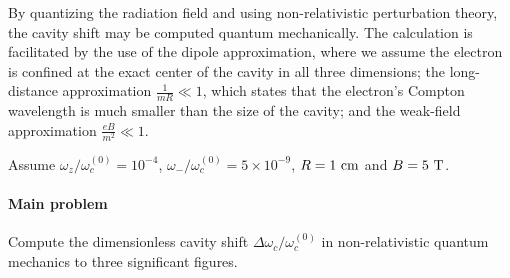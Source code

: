 By quantizing the radiation field and using non-relativistic perturbation theory, the cavity shift may be computed quantum mechanically. The calculation is facilitated by the use of the dipole approximation, where we assume the electron is confined at the exact center of the cavity in all three dimensions; the long-distance approximation $\frac{1}{mR} \ll 1$, which states that the electron's Compton wavelength is much smaller than the size of the cavity; and the weak-field approximation $\frac{eB}{m^2} \ll 1$.

Assume $\omega_z/\omega_c^{(0)} = 10^{-4}$, $\omega_-/\omega_c^{(0)} = 5 \times 10^{-9}$, $R = 1 \ {\rm cm}$ and $B = 5 \ {\rm T}$.

\paragraph*{Main problem}

Compute the dimensionless cavity shift $\Delta \omega_c/\omega_c^{(0)}$ in non-relativistic quantum mechanics to three significant figures.
